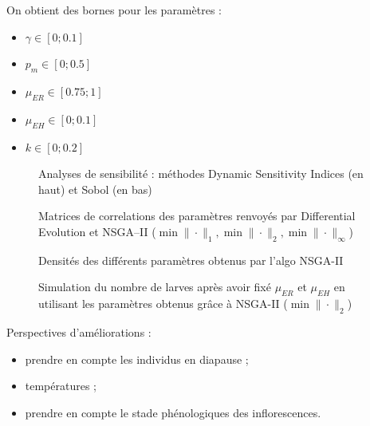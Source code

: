 \documentclass[11pt, a4paper]{beamer}
\newcommand{\1}{\mbox{\textbf{1}}}
\begin{document}
\begin{frame}
 On obtient des bornes pour les paramètres :
 \begin{itemize}
  \item $\gamma \in [0; 0.1 ]$
  \item $p_m \in [0; 0.5 ]$
  \item $\mu_{ER} \in [0.75 ; 1]$
  \item $\mu_{EH} \in [0;0.1]$
  \item $k \in [0;0.2]$
 \end{itemize}

\end{frame}

\begin{frame}
 \begin{figure}
 \centering
 \caption{Analyses de sensibilité : méthodes Dynamic Sensitivity Indices (en haut) et Sobol (en bas)}
\end{figure}
\end{frame}

\begin{frame}
 \begin{figure}
 \centering
 \caption{Matrices de correlations des paramètres renvoyés par Differential Evolution et NSGA--II ($\min \|\cdot\|_1, \min \|\cdot\|_2, \min \|\cdot\|_\infty$)}
\end{figure}
\end{frame}

\begin{frame}
  \begin{figure}
 \centering
 \caption{Densités des différents paramètres obtenus par l'algo NSGA-II}
\end{figure}
\end{frame}

\begin{frame}
  \begin{figure}
 \centering
 \caption{Simulation du nombre de larves après avoir fixé $\mu_{ER}$ et $\mu_{EH}$ en utilisant les paramètres obtenus grâce à NSGA-II ($\min \|\cdot\|_2$)}
\end{figure}
\end{frame}

\begin{frame}
 Perspectives d'améliorations :
 \begin{itemize}
 \item prendre en compte les individus en diapause ;
 \item températures ;
 \item prendre en compte le stade phénologiques des inflorescences.
 \end{itemize}

\end{frame}





 
\end{document}
